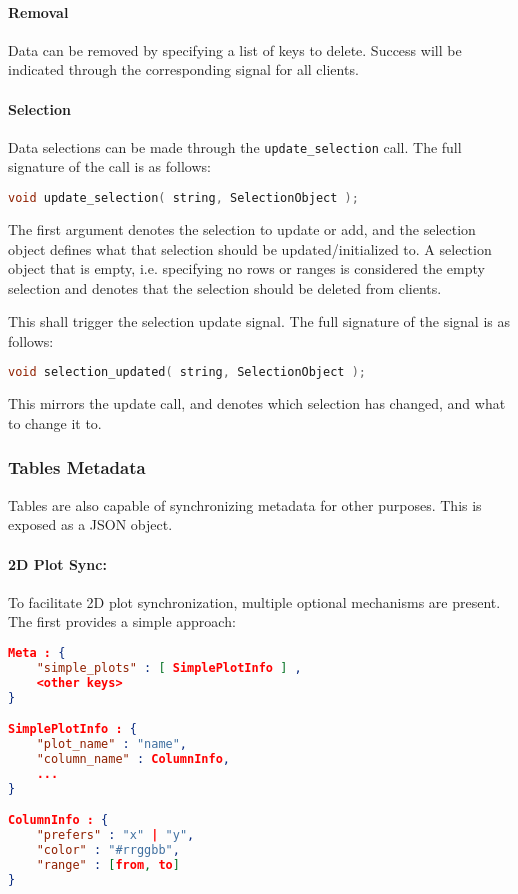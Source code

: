 \documentclass[11pt, oneside]{amsart}
\begin{document}
\paragraph{\textbf{Removal}} Data can be removed by specifying a list of keys to delete. Success will be indicated through the corresponding signal for all clients.

\paragraph{\textbf{Selection}} Data selections can be made through the \texttt{update\_selection} call. The full signature of the call is as follows:

\begin{lstlisting}[language=c++]
	void update_selection( string, SelectionObject );
\end{lstlisting}

The first argument denotes the selection to update or add, and the selection object defines what that selection should be updated/initialized to. A selection object that is empty, i.e. specifying no rows or ranges is considered the empty selection and denotes that the selection should be deleted from clients.

This shall trigger the selection update signal. The full signature of the signal is as follows:

\begin{lstlisting}[language=c++]
	void selection_updated( string, SelectionObject );
\end{lstlisting}

This mirrors the update call, and denotes which selection has changed, and what to change it to.

\subsubsection{Tables Metadata}

Tables are also capable of synchronizing metadata for other purposes. This is exposed as a JSON object.

\paragraph{2D Plot Sync:} To facilitate 2D plot synchronization, multiple optional mechanisms are present. The first provides a simple approach:

\begin{lstlisting}[language=json, label=listing:simple_sync_meta, caption=Table Metadata for Plot Sync ]
Meta : {
	"simple_plots" : [ SimplePlotInfo ] ,
	<other keys>
}

SimplePlotInfo : { 
	"plot_name" : "name",
	"column_name" : ColumnInfo, 
	... 
}

ColumnInfo : {
	"prefers" : "x" | "y",
	"color" : "#rrggbb",
	"range" : [from, to]
}
\end{lstlisting}
\end{document}
